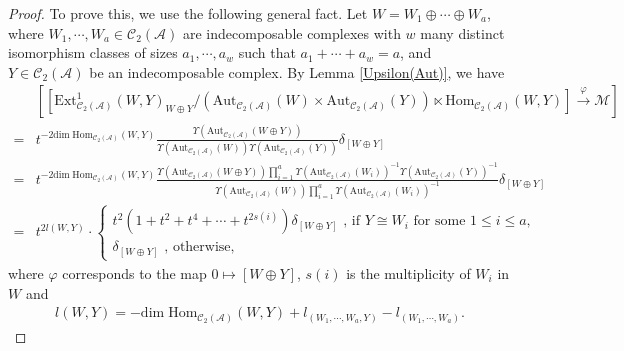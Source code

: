 \documentclass[12pt]{amsart}
\theoremstyle{definition}
\numberwithin{equation}{section}
\begin{document}
\begin{proof}
    To prove this, we use the following general fact.  
    Let $ W = W_1 \oplus \cdots \oplus W_a $, where $ W_1, \cdots, W_a \in \mathcal{C}_2(\mathcal{A}) $ are indecomposable complexes with $ w $ many distinct isomorphism classes of sizes $ a_1, \cdots, a_w $ such that $ a_1 + \cdots + a_w =  a $, and $ Y \in \mathcal{C}_2(\mathcal{A}) $ be an indecomposable complex. 
    By Lemma \ref{Upsilon(Aut)}, we have
    \begin{align*}
        & [[\mathrm{Ext}^1_{\mathcal{C}_2(\mathcal{A})}(W,Y)_{W \oplus Y}/(\mathrm{Aut}_{\mathcal{C}_2(\mathcal{A})}(W) \times \mathrm{Aut}_{\mathcal{C}_2(\mathcal{A})}(Y)) \ltimes \mathrm{Hom}_{\mathcal{C}_2(\mathcal{A})}(W,Y)] \xrightarrow{\varphi} \mathcal{M}] \\
        =& t^{-2 \mathrm{dim}\; \mathrm{Hom}_{\mathcal{C}_2(\mathcal{A})}(W,Y)} \frac{\Upsilon(\mathrm{Aut}_{\mathcal{C}_2(\mathcal{A})}(W \oplus Y))}{\Upsilon(\mathrm{Aut}_{\mathcal{C}_2(\mathcal{A})}(W))\Upsilon(\mathrm{Aut}_{\mathcal{C}_2(\mathcal{A})}(Y))}\delta_{[W \oplus Y]} \\
        =& t^{-2 \mathrm{dim}\; \mathrm{Hom}_{\mathcal{C}_2(\mathcal{A})}(W,Y)}\frac{\Upsilon(\mathrm{Aut}_{\mathcal{C}_2(\mathcal{A})}(W \oplus Y))\prod_{i=1}^a \Upsilon(\mathrm{Aut}_{\mathcal{C}_2(\mathcal{A})}(W_i))^{-1}\Upsilon(\mathrm{Aut}_{\mathcal{C}_2(\mathcal{A})}(Y))^{-1}}{\Upsilon(\mathrm{Aut}_{\mathcal{C}_2(\mathcal{A})}(W))\prod_{i=1}^a \Upsilon(\mathrm{Aut}_{\mathcal{C}_2(\mathcal{A})}(W_i))^{-1}}\delta_{[W \oplus Y]} \\
        =& t^{2l(W,Y)} \cdot \begin{cases}
            t^2(1+t^2+ t^4 + \cdots + t^{2s(i)})\delta_{[W \oplus Y]}   \text{ , if } Y \cong W_i \text{ for some }   1 \leqslant i \leqslant a,  \\
            \delta_{[W \oplus Y]} \text{ , otherwise, } 
            \end{cases}
    \end{align*}
    where $ \varphi $ corresponds to the map $ 0 \mapsto [W \oplus Y] $, $ s(i) $ is the multiplicity of $ W_i $ in $ W $ and
    \begin{align*}
        l(W,Y) = - \mathrm{dim}\; \mathrm{Hom}_{\mathcal{C}_2(\mathcal{A})}(W,Y)+l_{(W_1, \cdots, W_a,Y)}-l_{(W_1,\cdots,W_a)}.
    \end{align*}


\end{proof}
\end{document}
